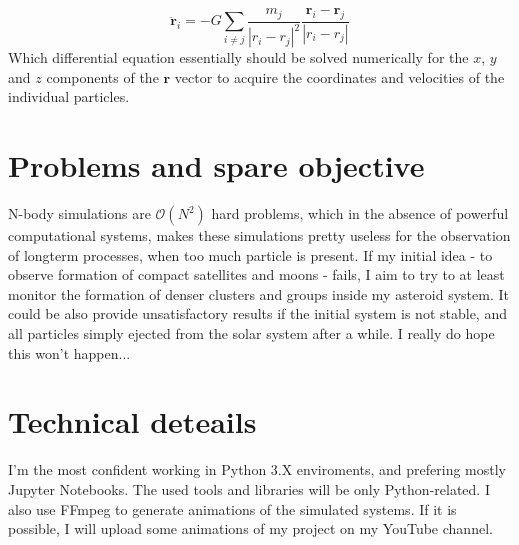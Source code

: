 \begin{multicols}{2}
\begin{equation}
\boldsymbol{\ddot{r}}_{i}
=
- G \sum_{i \neq j} \frac{m_{j}}{\left| r_{i} - r_{j} \right|^{2}} \frac{\boldsymbol{r}_{i} - \boldsymbol{r}_{j}}{\left| r_{i} - r_{j} \right|}
\end{equation}
Which differential equation essentially should be solved numerically for the $x$, $y$ and $z$ components of the $\boldsymbol{r}$ vector to acquire the coordinates and velocities of the individual particles.

\section{Problems and spare objective}
N-body simulations are $\mathcal{O} \left( N ^{2} \right)$ hard problems, which in the absence of powerful computational systems, makes these simulations pretty useless for the observation of longterm processes, when too much particle is present. If my initial idea - to observe formation of compact satellites and moons - fails, I aim to try to at least monitor the formation of denser clusters and groups inside my asteroid system. \newline
It could be also provide unsatisfactory results if the initial system is not stable, and all particles simply ejected from the solar system after a while. I really do hope this won't happen...

\section{Technical deteails}
I'm the most confident working in Python 3.X enviroments, and prefering mostly Jupyter Notebooks. The used tools and libraries will be only Python-related. I also use FFmpeg to generate animations of the simulated systems. If it is possible, I will upload some animations of my project on my YouTube channel.

\end{multicols}